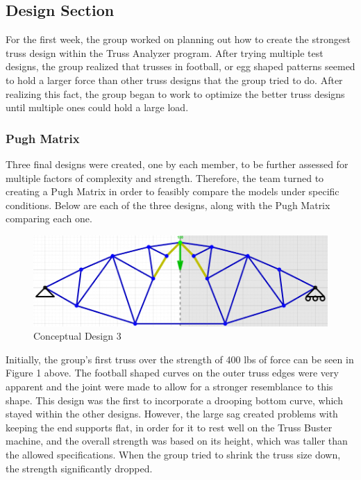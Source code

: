 \documentclass{article}
\begin{document}
\subsection{Design Section}
For the first week, the group worked on planning out how to create the strongest truss design within the Truss Analyzer program. After trying multiple test designs, the group realized that trusses in football, or egg shaped patterns seemed to hold a larger force than other truss designs that the group tried to do. After realizing this fact, the group began to work to optimize the better truss designs until multiple ones could hold a large load. 

\subsubsection{Pugh Matrix}
Three final designs were created, one by each member, to be further assessed for multiple factors of complexity and strength. Therefore, the team turned to creating a Pugh Matrix in order to feasibly compare the models under specific conditions. Below are each of the three designs, along with the Pugh Matrix comparing each one. 

\begin{figure}[h]
\caption{Conceptual Design 3}
\centering
\includegraphics[width=400pt]{truss449.png}
\end{figure}

Initially, the group's first truss over the strength of 400 lbs of force can be seen in Figure 1 above. The football shaped curves on the outer truss edges were very apparent and the joint were made to allow for a stronger resemblance to this shape. This design was the first to incorporate a drooping bottom curve, which stayed within the other designs. However, the large sag created problems with keeping the end supports flat, in order for it to rest well on the Truss Buster machine, and the overall strength was based on its height, which was taller than the allowed specifications. When the group tried to shrink the truss size down, the strength significantly dropped.
\end{document}
